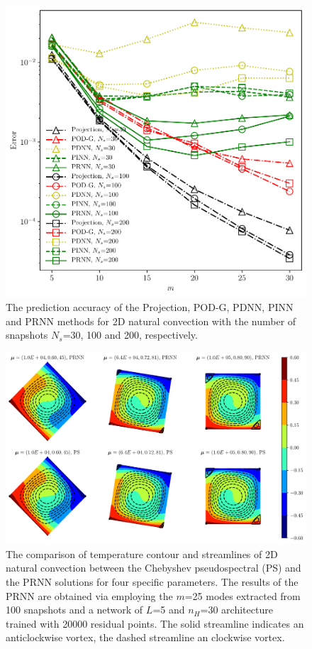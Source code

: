 \documentclass[preprint, 10pt]{elsarticle}
\begin{document}
\begin{figure}[!ht]
  \centering
  \includegraphics[width=12cm]{../../pythonNN/2DNaturalConvection/fig/ErrorComparsion_SampleNum.pdf}
\caption{The prediction accuracy of the Projection, POD-G, PDNN, PINN and PRNN methods for 2D natural convection with the number of snapshots $N_s$=30, 100 and 200, respectively.}
\label{fig_2DNaturalConvectionErrorComparsion_SampleNum}
\end{figure}

\begin{figure}[!ht]
  \centering
  \includegraphics[width=16cm]{../../pythonNN/2DNaturalConvection/fig/ResultComparsion.pdf}
\caption{The comparison of temperature contour and streamlines of 2D natural convection between the Chebyshev pseudospectral (PS) and the PRNN solutions for four specific parameters. The results of the PRNN are obtained via employing the $m$=25 modes extracted from 100 snapshots and a network of $L$=5 and $n_H$=30 architecture trained with 20000 residual points. The solid streamline indicates an anticlockwise vortex, the dashed streamline an clockwise vortex.}
\label{fig_2DNaturalConvectionResultComparsion}
\end{figure}
\end{document}
